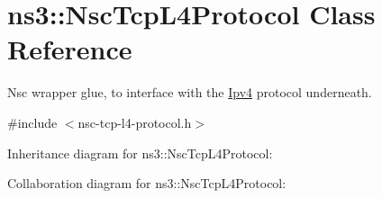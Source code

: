 \hypertarget{classns3_1_1NscTcpL4Protocol}{}\section{ns3\+:\+:Nsc\+Tcp\+L4\+Protocol Class Reference}
\label{classns3_1_1NscTcpL4Protocol}


Nsc wrapper glue, to interface with the \hyperlink{classns3_1_1Ipv4}{Ipv4} protocol underneath.  




{\ttfamily \#include $<$nsc-\/tcp-\/l4-\/protocol.\+h$>$}



Inheritance diagram for ns3\+:\+:Nsc\+Tcp\+L4\+Protocol\+:


Collaboration diagram for ns3\+:\+:Nsc\+Tcp\+L4\+Protocol\+:
